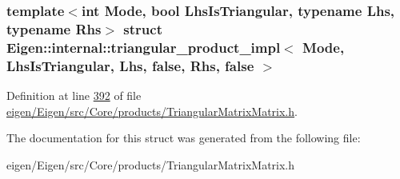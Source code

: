 \subsubsection*{template$<$int Mode, bool Lhs\+Is\+Triangular, typename Lhs, typename Rhs$>$\newline
struct Eigen\+::internal\+::triangular\+\_\+product\+\_\+impl$<$ Mode, Lhs\+Is\+Triangular, Lhs, false, Rhs, false $>$}



Definition at line \hyperlink{eigen_2_eigen_2src_2_core_2products_2_triangular_matrix_matrix_8h_source_l00392}{392} of file \hyperlink{eigen_2_eigen_2src_2_core_2products_2_triangular_matrix_matrix_8h_source}{eigen/\+Eigen/src/\+Core/products/\+Triangular\+Matrix\+Matrix.\+h}.



The documentation for this struct was generated from the following file\+:\begin{DoxyCompactItemize}
\item 
eigen/\+Eigen/src/\+Core/products/\+Triangular\+Matrix\+Matrix.\+h\end{DoxyCompactItemize}
